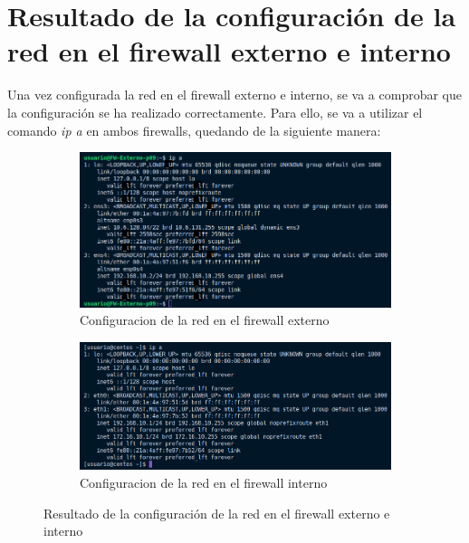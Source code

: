 \documentclass[11pt]{report}
\begin{document}


\section{Resultado de la configuración de la red en el firewall externo e interno}
Una vez configurada la red en el firewall externo e interno, se va a comprobar que la configuración
se ha realizado correctamente. Para ello, se va a utilizar el comando \emph{ip a} en ambos firewalls,
quedando de la siguiente manera:
\begin{figure}[H]
  \begin{subfigure}{0.5\textwidth}
    \centering
    \includegraphics[scale=0.35]{img/ip_a_fw_externo.png}
    \caption{Configuracion de la red en el firewall externo}
  \end{subfigure}%
  \begin{subfigure}{0.5\textwidth}
    \centering
    \includegraphics[scale=0.38]{img/ip_a_fw_interno.png}
    \caption{Configuracion de la red en el firewall interno}
  \end{subfigure}
  \caption{Resultado de la configuración de la red en el firewall externo e interno}
\end{figure}
\end{document}
